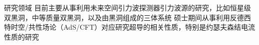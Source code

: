 
\begin{rubric}{研究领域}
\entry*[引力波天文学]
    目前主要从事利用未来空间引力波探测器引力波源的研究，比如恒星级双黑洞，中等质量双黑洞，以及由黑洞组成的三体系统 
\entry*[全息超导]
    硕士期间从事利用反德西特时空/共性场论（AdS/CFT）对应研究超导的相关性质，特别是约瑟夫森结电流性质的研究 
\end{rubric}
